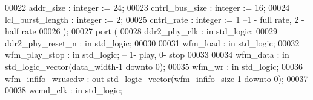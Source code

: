 \begin{DoxyCode}
00022         \textcolor{vhdlchar}{addr_size}               \textcolor{vhdlchar}{:} \textcolor{comment}{integer} \textcolor{vhdlchar}{:=} \textcolor{vhdllogic}{}\textcolor{vhdllogic}{24};
00023         \textcolor{vhdlchar}{cntrl_bus_size}          \textcolor{vhdlchar}{:} \textcolor{comment}{integer} \textcolor{vhdlchar}{:=} \textcolor{vhdllogic}{}\textcolor{vhdllogic}{16};
00024         \textcolor{vhdlchar}{lcl_burst_length}        \textcolor{vhdlchar}{:} \textcolor{comment}{integer} \textcolor{vhdlchar}{:=} \textcolor{vhdllogic}{}\textcolor{vhdllogic}{2};
00025         \textcolor{vhdlchar}{cntrl_rate}              \textcolor{vhdlchar}{:} \textcolor{comment}{integer} \textcolor{vhdlchar}{:=} \textcolor{vhdllogic}{}\textcolor{vhdllogic}{1}\textcolor{keyword}{ --1 - full rate, 2 - half rate}
00026 \textcolor{vhdlchar}{)};
00027   \textcolor{keywordflow}{port} \textcolor{vhdlchar}{(}
00028         \textcolor{vhdlchar}{ddr2_phy_clk}            \textcolor{vhdlchar}{:} \textcolor{keywordflow}{in} \textcolor{comment}{std\_logic};
00029         \textcolor{vhdlchar}{ddr2_phy_reset_n}        \textcolor{vhdlchar}{:} \textcolor{keywordflow}{in} \textcolor{comment}{std\_logic};
00030 
00031         \textcolor{vhdlchar}{wfm_load}                    \textcolor{vhdlchar}{:} \textcolor{keywordflow}{in} \textcolor{comment}{std\_logic};
00032         \textcolor{vhdlchar}{wfm_play_stop}           \textcolor{vhdlchar}{:} \textcolor{keywordflow}{in} \textcolor{comment}{std\_logic};\textcolor{keyword}{ -- 1- play, 0- stop}
00033 
00034         \textcolor{vhdlchar}{wfm_data}                    \textcolor{vhdlchar}{:} \textcolor{keywordflow}{in} \textcolor{comment}{std\_logic\_vector}\textcolor{vhdlchar}{(}\textcolor{vhdlchar}{data_width}\textcolor{vhdlchar}{-}\textcolor{vhdllogic}{}\textcolor{vhdllogic}{1} \textcolor{keywordflow}{downto} \textcolor{vhdllogic}{}\textcolor{vhdllogic}{0}\textcolor{vhdlchar}{)};
00035         \textcolor{vhdlchar}{wfm_wr}                  \textcolor{vhdlchar}{:} \textcolor{keywordflow}{in} \textcolor{comment}{std\_logic};
00036         \textcolor{vhdlchar}{wfm_infifo_wrusedw}  \textcolor{vhdlchar}{:} \textcolor{keywordflow}{out} \textcolor{comment}{std\_logic\_vector}\textcolor{vhdlchar}{(}\textcolor{vhdlchar}{wfm_infifo_size}\textcolor{vhdlchar}{-}\textcolor{vhdllogic}{}\textcolor{vhdllogic}{1} \textcolor{keywordflow}{downto} \textcolor{vhdllogic}{}\textcolor{vhdllogic}{0}\textcolor{vhdlchar}{)};
00037 
00038         \textcolor{vhdlchar}{wcmd_clk}                    \textcolor{vhdlchar}{:} \textcolor{keywordflow}{in} \textcolor{comment}{std\_logic};

\end{DoxyCode}
